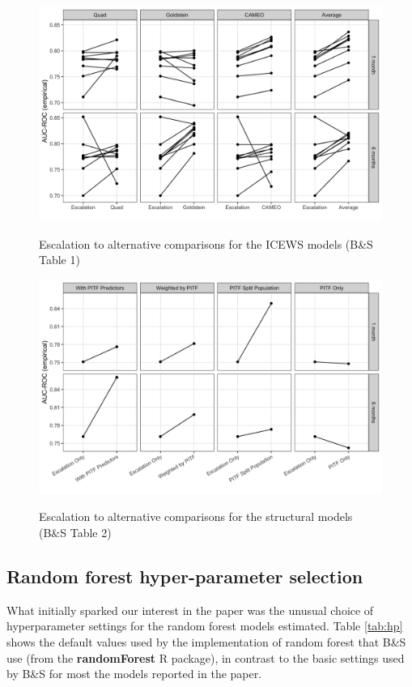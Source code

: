 \documentclass[
]{article}
\begin{document}
\begin{figure}
{\centering
\includegraphics[width=.9\linewidth]{figures/fig-A1-table1-pairs.png}
}
\caption{Escalation to alternative comparisons for the ICEWS models (B\&S Table 1)\label{fig:table1-plot}}
\end{figure}

\begin{figure}
{\centering
\includegraphics[width=.9\linewidth]{figures/fig-A2-table2-pairs.png}
}
\caption{Escalation to alternative comparisons for the structural models (B\&S Table 2)\label{fig:table2-plot}}
\end{figure}

\newpage

\hypertarget{random-forest-hyper-parameter-selection}{%
\subsection{Random forest hyper-parameter selection}\label{random-forest-hyper-parameter-selection}}

What initially sparked our interest in the paper was the unusual choice of hyperparameter settings for the random forest models estimated. Table \ref{tab:hp} shows the default values used by the implementation of random forest that B\&S use (from the \textbf{randomForest} R package), in contrast to the basic settings used by B\&S for most the models reported in the paper.
\end{document}
